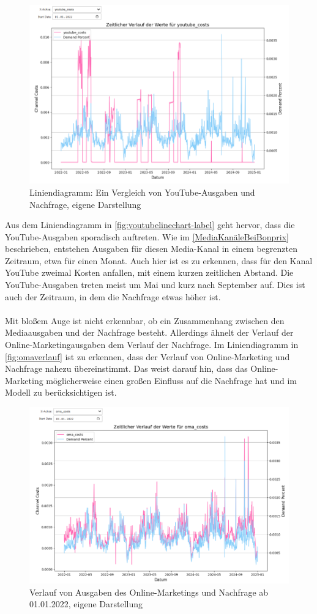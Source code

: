 \begin{figure}[ht]
    \centering
    \includegraphics[width=0.98\linewidth]{images/youtubeLineChart.png}
    \caption{Liniendiagramm: Ein Vergleich von YouTube-Ausgaben und Nachfrage, eigene Darstellung}
    \label{fig:youtubelinechart-label}
\end{figure}
\noindent
Aus dem Liniendiagramm in \autoref{fig:youtubelinechart-label} geht hervor, dass die YouTube-Ausgaben sporadisch auftreten. Wie im \autoref{MediaKanäleBeiBonprix} beschrieben, entstehen Ausgaben für diesen Media-Kanal in einem begrenzten Zeitraum, etwa für einen Monat. Auch hier ist es zu erkennen, dass für den Kanal YouTube zweimal Kosten anfallen, mit einem kurzen zeitlichen Abstand. Die YouTube-Ausgaben treten meist um Mai und kurz nach September auf. Dies ist auch der Zeitraum, in dem die Nachfrage etwas höher ist. \\\\
Mit bloßem Auge ist nicht erkennbar, ob ein Zusammenhang zwischen den Mediaausgaben und der Nachfrage besteht. Allerdings ähnelt der Verlauf der Online-Marketingausgaben dem Verlauf der Nachfrage. Im Liniendiagramm in \autoref{fig:omaverlauf} ist zu erkennen, dass der Verlauf von Online-Marketing und Nachfrage nahezu übereinstimmt. Das weist darauf hin, dass das Online-Marketing möglicherweise einen großen Einfluss auf die Nachfrage hat und im Modell zu berücksichtigen ist.
\begin{figure}[H]
    \centering
    \includegraphics[width=0.8\linewidth]{images/omacosts.png}
    \caption{Verlauf von Ausgaben des Online-Marketings und Nachfrage ab 01.01.2022, eigene Darstellung}
    \label{fig:omaverlauf}
\end{figure}
